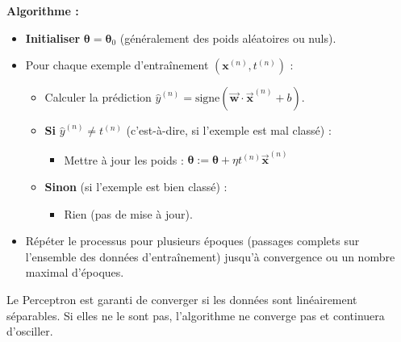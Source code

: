 \documentclass{article}
\begin{document}
\textbf{Algorithme :}
\begin{itemize}
    \item \textbf{Initialiser} $\mathbf{\theta} = \mathbf{\theta}_0$ (généralement des poids aléatoires ou nuls).
    \item Pour chaque exemple d'entraînement $(\mathbf{x}^{(n)}, t^{(n)})$ :
        \begin{itemize}
            \item Calculer la prédiction $\hat{y}^{(n)} = \text{signe}(\mathbf{\vec{w}} \cdot \mathbf{\vec{x}}^{(n)} + b)$.
            \item \textbf{Si} $\hat{y}^{(n)} \neq t^{(n)}$ (c'est-à-dire, si l'exemple est mal classé) :
                \begin{itemize}
                    \item Mettre à jour les poids : $\mathbf{\theta} := \mathbf{\theta} + \eta t^{(n)} \mathbf{\vec{x}}^{(n)}$
                \end{itemize}
            \item \textbf{Sinon} (si l'exemple est bien classé) :
                \begin{itemize}
                    \item Rien (pas de mise à jour).
                \end{itemize}
        \end{itemize}
    \item Répéter le processus pour plusieurs époques (passages complets sur l'ensemble des données d'entraînement) jusqu'à convergence ou un nombre maximal d'époques.
\end{itemize}
Le Perceptron est garanti de converger si les données sont linéairement séparables. Si elles ne le sont pas, l'algorithme ne converge pas et continuera d'osciller.
\end{document}
